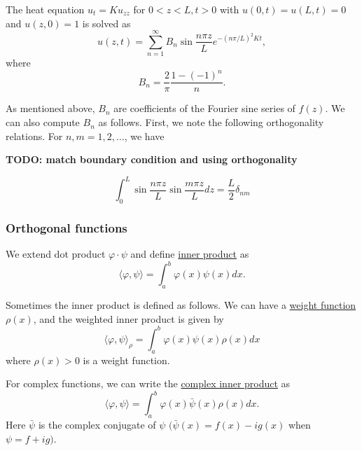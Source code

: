 \begin{example}[]
The heat equation $u_t=K u_{z z}$ for $0<z<L, t>0$ with $u(0, t)=u(L, t)=0$ and $u(z, 0)=1$ is solved as
$$
u(z, t)=\sum_{n=1}^{\infty} B_n \sin \frac{n \pi z}{L} e^{-(n \pi / L)^2 K t},
$$
where
$$
B_n=\frac{2}{\pi} \frac{1-(-1)^n}{n} .
$$

As mentioned above, $B_n$ are coefficients of the Fourier sine series of $f(z)$. We can also compute $B_n$ as follows. First, we note the following orthogonality relations. For $n, m=1,2, \ldots$, we have

\textbf{TODO: match boundary condition and using orthogonality}

\begin{equation*}
    \int_0^L \sin \frac{n \pi z}{L} \sin \frac{m \pi z}{L} d z = \frac{L}{2} \delta_{n m}
\end{equation*}
\end{example}

\subsubsection{Orthogonal functions}

\begin{definition} We extend dot product $\varphi \cdot \psi$ and define \underline{inner product} as
\begin{equation}\label{eq.inner_product}
    \langle\varphi, \psi\rangle=\int_a^b \varphi(x) \psi(x) d x .
\end{equation}
    
Sometimes the inner product is defined as follows. We can have a \underline{weight function} $\rho(x)$, and the weighted inner product is given by
\begin{equation}\label{eq.inner_product_weight}
    \langle\varphi, \psi\rangle_\rho=\int_a^b \varphi(x) \psi(x) \rho(x) d x
\end{equation}
where $\rho(x)>0$ is a weight function. 

For complex functions, we can write the \underline{complex inner product} as
\begin{equation}\label{eq.inner_product_complex}
    \langle\varphi, \psi\rangle=\int_a^b \varphi(x) \bar{\psi}(x) \rho(x) d x .
\end{equation}
Here $\bar{\psi}$ is the complex conjugate of $\psi$ $(\bar{\psi}(x)=f(x)-i g(x)$ when $\psi=f+i g)$.
    
\end{definition}

